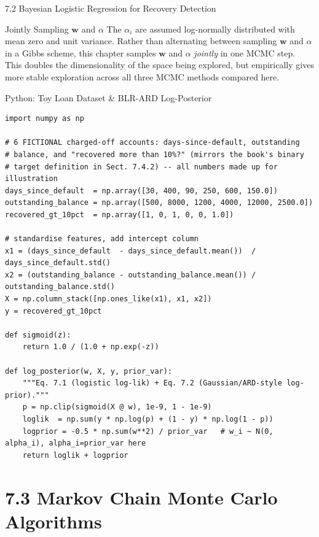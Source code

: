 \documentclass[aspectratio=169,10pt]{beamer}
\newcommand{\bw}{\mathbf{w}}
\begin{document}
\begin{frame}[allowframebreaks]{7.2 Bayesian Logistic Regression for Recovery Detection}
\begin{block}{Jointly Sampling $\bw$ and $\alpha$}
The $\alpha_i$ are assumed log-normally distributed with mean zero and unit variance. Rather than alternating between sampling $\bw$ and $\alpha$ in a Gibbs scheme, this chapter samples $\bw$ and $\alpha$ \emph{jointly} in one MCMC step. This doubles the dimensionality of the space being explored, but empirically gives more stable exploration across all three MCMC methods compared here.
\end{block}

\end{frame}

\begin{frame}[fragile]{Python: Toy Loan Dataset \& BLR-ARD Log-Posterior}
\begin{lstlisting}[caption={A tiny illustrative "loan recovery" dataset and the BLR log-posterior building blocks (author's toy code, not the book's)}]
import numpy as np

# 6 FICTIONAL charged-off accounts: days-since-default, outstanding
# balance, and "recovered more than 10%?" (mirrors the book's binary
# target definition in Sect. 7.4.2) -- all numbers made up for illustration
days_since_default  = np.array([30, 400, 90, 250, 600, 150.0])
outstanding_balance = np.array([500, 8000, 1200, 4000, 12000, 2500.0])
recovered_gt_10pct  = np.array([1, 0, 1, 0, 0, 1.0])

# standardise features, add intercept column
x1 = (days_since_default  - days_since_default.mean())  / days_since_default.std()
x2 = (outstanding_balance - outstanding_balance.mean()) / outstanding_balance.std()
X = np.column_stack([np.ones_like(x1), x1, x2])
y = recovered_gt_10pct

def sigmoid(z):
    return 1.0 / (1.0 + np.exp(-z))

def log_posterior(w, X, y, prior_var):
    """Eq. 7.1 (logistic log-lik) + Eq. 7.2 (Gaussian/ARD-style log-prior)."""
    p = np.clip(sigmoid(X @ w), 1e-9, 1 - 1e-9)
    loglik  = np.sum(y * np.log(p) + (1 - y) * np.log(1 - p))
    logprior = -0.5 * np.sum(w**2) / prior_var   # w_i ~ N(0, alpha_i), alpha_i=prior_var here
    return loglik + logprior
\end{lstlisting}
\end{frame}

\section{7.3 Markov Chain Monte Carlo Algorithms}
\end{document}
